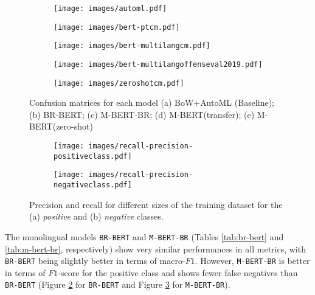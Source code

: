 \documentclass[11pt,a4paper]{article}
\begin{document}
\begin{figure*}[!ht]
\centering
\begin{subfigure}{.4\columnwidth}
  \centering
\texttt{[image: images/automl.pdf]}
  \caption{}
  \label{fig:cm-bow}
\end{subfigure}
\begin{subfigure}{.4\columnwidth}
\centering
\texttt{[image: images/bert-ptcm.pdf]}
  \caption{}
  \label{fig:cm-br-bert}
\end{subfigure}
\begin{subfigure}{.4\columnwidth}
  \centering
\texttt{[image: images/bert-multilangcm.pdf]}
  \caption{}
  \label{fig:cm-m-bert-br}
\end{subfigure}
\begin{subfigure}{.4\columnwidth}
  \centering
\texttt{[image: images/bert-multilangoffenseval2019.pdf]}
  \caption{}
  \label{fig:cm-m-bert-zero}
\end{subfigure}
\begin{subfigure}{.4\columnwidth}
  \centering
\texttt{[image: images/zeroshotcm.pdf]} 
  \caption{}
  \label{fig:cm-m-bert-transfer}
\end{subfigure}
\caption{Confusion matrices for each model (a) BoW+AutoML (Baseline); (b) BR-BERT; (c) M-BERT-BR; (d) M-BERT(transfer); (e) M-BERT(zero-shot)}
\label{fig:fig}
\end{figure*}

\begin{figure*}
\begin{subfigure}{.5\textwidth}
  \centering
\texttt{[image: images/recall-precision-positiveclass.pdf]}
  \caption{}
  \label{fig:learning-curve-positive}
\end{subfigure}
\begin{subfigure}{.5\textwidth}
  \centering
\texttt{[image: images/recall-precision-negativeclass.pdf]}
  \caption{}
  \label{fig:learning-curve-negative}
  \end{subfigure}
\caption{Precision and recall for different sizes of the training dataset for the (a) \textit{positive} and (b) \textit{negative} classes.}
\label{fig:learning-curve}
\end{figure*}

The monolingual models \texttt{BR-BERT} and \texttt{M-BERT-BR} (Tables \ref{tab:br-bert} and \ref{tab:m-bert-br}, respectively) show very similar performances in all metrics, with \texttt{BR-BERT} being slightly better in terms of macro-$F1$. However, \texttt{M-BERT-BR} is better in terms of $F1$-score for the positive class and shows fewer false negatives than \texttt{BR-BERT} (Figure \ref{fig:cm-br-bert} for \texttt{BR-BERT} and Figure \ref{fig:cm-m-bert-br} for \texttt{M-BERT-BR}). 
\end{document}
